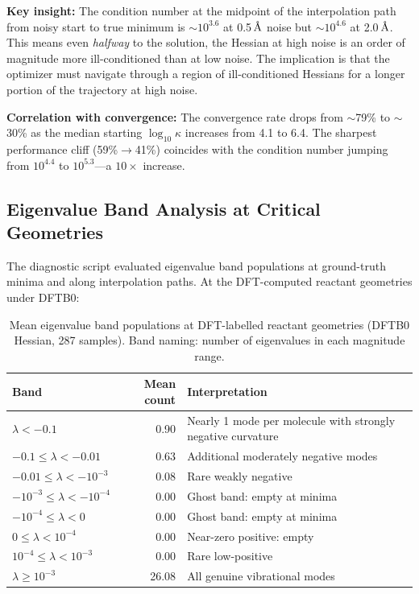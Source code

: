 \documentclass[11pt,a4paper]{article}
\newcommand{\eval}{\lambda}
\newcommand{\angstrom}{\text{\r{A}}}
\begin{document}
\textbf{Key insight:} The condition number at the midpoint of the interpolation path from noisy start to true minimum is $\sim\!10^{3.6}$ at 0.5\,$\angstrom$ noise but $\sim\!10^{4.6}$ at 2.0\,$\angstrom$. This means even \emph{halfway} to the solution, the Hessian at high noise is an order of magnitude more ill-conditioned than at low noise. The implication is that the optimizer must navigate through a region of ill-conditioned Hessians for a longer portion of the trajectory at high noise.

\textbf{Correlation with convergence:} The convergence rate drops from $\sim$79\% to $\sim$30\% as the median starting $\log_{10}\kappa$ increases from 4.1 to 6.4. The sharpest performance cliff (59\%$\to$41\%) coincides with the condition number jumping from $10^{4.4}$ to $10^{5.3}$---a $10\times$ increase.

\subsection{Eigenvalue Band Analysis at Critical Geometries}

The diagnostic script evaluated eigenvalue band populations at ground-truth minima and along interpolation paths. At the DFT-computed reactant geometries under DFTB0:

\begin{table}[H]
\centering
\caption{Mean eigenvalue band populations at DFT-labelled reactant geometries (DFTB0 Hessian, 287 samples). Band naming: number of eigenvalues in each magnitude range.}
\label{tab:band-reactant}
\small
\begin{tabular}{lrp{7cm}}
\toprule
Band & Mean count & Interpretation \\
\midrule
$\eval < -0.1$ & 0.90 & Nearly 1 mode per molecule with strongly negative curvature \\
$-0.1 \leq \eval < -0.01$ & 0.63 & Additional moderately negative modes \\
$-0.01 \leq \eval < -10^{-3}$ & 0.08 & Rare weakly negative \\
$-10^{-3} \leq \eval < -10^{-4}$ & 0.00 & Ghost band: empty at minima \\
$-10^{-4} \leq \eval < 0$ & 0.00 & Ghost band: empty at minima \\
$0 \leq \eval < 10^{-4}$ & 0.00 & Near-zero positive: empty \\
$10^{-4} \leq \eval < 10^{-3}$ & 0.00 & Rare low-positive \\
$\eval \geq 10^{-3}$ & 26.08 & All genuine vibrational modes \\
\bottomrule
\end{tabular}
\end{table}
\end{document}
